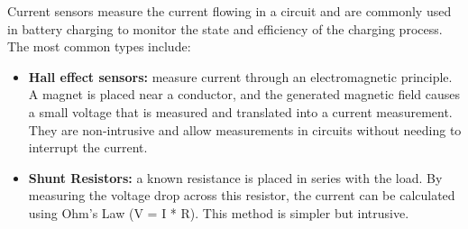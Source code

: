 Current sensors measure the current flowing in a circuit and are commonly used in battery charging to monitor the state and efficiency of the charging process. The most common types include:

\begin{itemize}
  \item \textbf{Hall effect sensors:} measure current through an electromagnetic principle. A magnet is placed near a conductor, and the generated magnetic field causes a small voltage that is measured and translated into a current measurement. They are non-intrusive and allow measurements in circuits without needing to interrupt the current.
  \item \textbf{Shunt Resistors:} a known resistance is placed in series with the load. By measuring the voltage drop across this resistor, the current can be calculated using Ohm's Law (V = I * R). This method is simpler but intrusive.
\end{itemize}